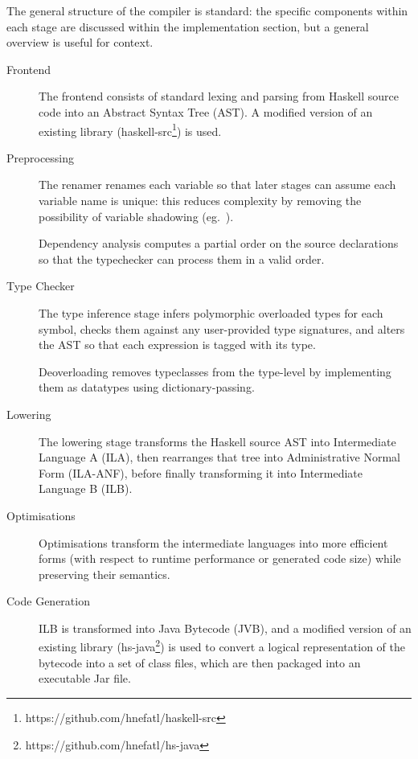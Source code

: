 \documentclass[dissertation.tex]{subfiles}
\begin{document}
{

    The general structure of the compiler is standard: the specific components within each stage are discussed within
    the implementation section, but a general overview is useful for context.

    \begin{description}
    \item[Frontend]
    {
        \hfill

        The frontend consists of standard lexing and parsing from Haskell source code into an Abstract Syntax Tree
        (AST). A modified version of an existing library (haskell-src\footnote{https://github.com/hnefatl/haskell-src})
        is used.

    }
    \item[Preprocessing]
    {
        \hfill

        The renamer renames each variable so that later stages can assume each variable name is unique: this reduces
        complexity by removing the possibility of variable shadowing (eg.\ ).

        Dependency analysis computes a partial order on the source declarations so that the typechecker can process them
        in a valid order.

    }
    \item[Type Checker]
    {
        \hfill

        The type inference stage infers polymorphic overloaded types for each symbol, checks them against any
        user-provided type signatures, and alters the AST so that each expression is tagged with its type.

        Deoverloading removes typeclasses from the type-level by implementing them as datatypes using
        dictionary-passing.

    }
    \item[Lowering]
    {
        \hfill

        The lowering stage transforms the Haskell source AST into Intermediate Language A (ILA), then rearranges that
        tree into Administrative Normal Form (ILA-ANF), before finally transforming it into Intermediate Language B
        (ILB).

    }
    \item[Optimisations]
    {
        \hfill

        Optimisations transform the intermediate languages into more efficient forms (with respect to runtime
        performance or generated code size) while preserving their semantics.

    }
    \item[Code Generation]
    {
        \hfill

        ILB is transformed into Java Bytecode (JVB), and a modified version of an existing library
        (hs-java\footnote{https://github.com/hnefatl/hs-java}) is used to convert a logical representation of the
        bytecode into a set of class files, which are then packaged into an executable Jar file.

    }
    \end{description}
}
\end{document}
